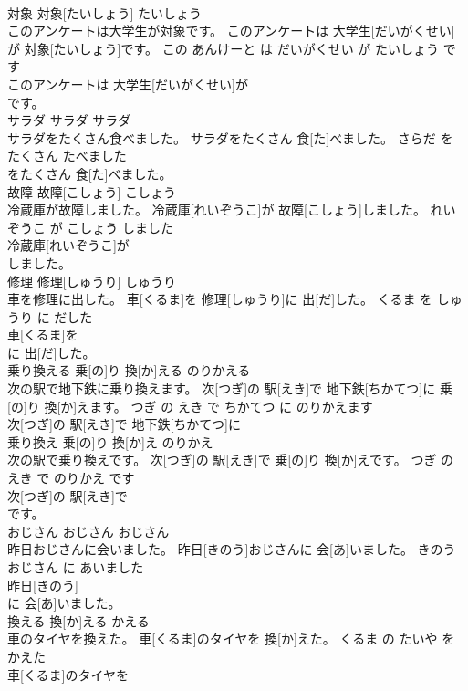\documentclass[8pt]{extreport}
\begin{document}
\begin{CJK}{UTF8}{min}
\\	対象	対象[たいしょう]	たいしょう	
\\	このアンケートは大学生が対象です。	このアンケートは 大学生[だいがくせい]が 対象[たいしょう]です。	この あんけーと は だいがくせい が たいしょう です	
\\	このアンケートは 大学生[だいがくせい]が
\\	です。			
\\	サラダ	サラダ	サラダ	
\\	サラダをたくさん食べました。	サラダをたくさん 食[た]べました。	さらだ を たくさん たべました	
\\	をたくさん 食[た]べました。			
\\	故障	故障[こしょう]	こしょう	
\\	冷蔵庫が故障しました。	冷蔵庫[れいぞうこ]が 故障[こしょう]しました。	れいぞうこ が こしょう しました	
\\	冷蔵庫[れいぞうこ]が
\\	しました。			
\\	修理	修理[しゅうり]	しゅうり	
\\	車を修理に出した。	車[くるま]を 修理[しゅうり]に 出[だ]した。	くるま を しゅうり に だした	
\\	車[くるま]を
\\	に 出[だ]した。			
\\	乗り換える	乗[の]り 換[か]える	のりかえる	
\\	次の駅で地下鉄に乗り換えます。	次[つぎ]の 駅[えき]で 地下鉄[ちかてつ]に 乗[の]り 換[か]えます。	つぎ の えき で ちかてつ に のりかえます	
\\	次[つぎ]の 駅[えき]で 地下鉄[ちかてつ]に
\\	乗り換え	乗[の]り 換[か]え	のりかえ	
\\	次の駅で乗り換えです。	次[つぎ]の 駅[えき]で 乗[の]り 換[か]えです。	つぎ の えき で のりかえ です	
\\	次[つぎ]の 駅[えき]で
\\	です。			
\\	おじさん	おじさん	おじさん	
\\	昨日おじさんに会いました。	昨日[きのう]おじさんに 会[あ]いました。	きのう おじさん に あいました	
\\	昨日[きのう]
\\	に 会[あ]いました。			
\\	換える	換[か]える	かえる	
\\	車のタイヤを換えた。	車[くるま]のタイヤを 換[か]えた。	くるま の たいや を かえた	
\\	車[くるま]のタイヤを

\end{CJK}
\end{document}
